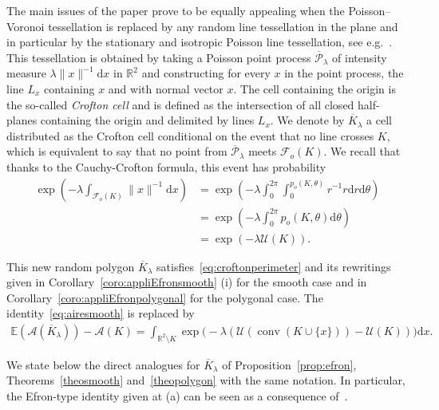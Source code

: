 \documentclass[AHL,Unicode,longabstracts,published]{cedram}
\DeclareMathOperator{\conv}{conv}
\newcommand{\cA}{\mathcal{A}}
\newcommand{\cF}{\mathcal{F}}
\newcommand{\cP}{\mathcal{P}}
\newcommand{\cU}{\mathcal{U}}
\newcommand{\dd}{\mathrm{d}}
\newcommand{\E}{\mathbb{E}}
\newcommand{\R}{\mathbb{R}}
\newcommand{\noi}{\noindent}
\newcommand{\R}{\mathbb{R}}
\begin{document}
The main issues of the paper prove to be equally appealing when the Poisson--Voronoi tessellation is replaced by any random line tessellation in the plane and in particular by the stationary and isotropic Poisson line tessellation, see e.g.~\cite[Section~10.3]{SW}. This tessellation is obtained by taking a Poisson point process $\overline{\cP}_\lambda$ of intensity measure $\lambda \|x\|^{-1}\dd x$ in $\R^2$ and constructing for every $x$ in the point process, the line $L_{x}$ containing $x$ and with normal vector $x$. The cell containing the origin is the so-called \emph{Crofton cell} and is defined as the intersection of all closed half-planes containing the origin and delimited by lines $L_{x}$. We denote by $\overline{K}_\lambda$ a cell distributed as the Crofton cell conditional on the event that no line crosses $K$, which is equivalent to say that no point from $\overline{\cP}_\lambda$ meets $\cF_o(K)$. We recall that thanks to the Cauchy-Crofton formula, this event has probability
\begin{align}
\exp\left(-\lambda\int_{\cF_o(K)}\|x\|^{-1}\dd x\right)&=\exp\left(-\lambda\int_{0}^{2\pi}\int_0^{p_o(K,\theta)}r^{-1}r\dd r \dd \theta\right)\nonumber\\
&=\exp\left(-\lambda\int_{0}^{2\pi}p_o(K,\theta)\dd \theta\right)\nonumber
\\
&=\exp(-\lambda\cU(K)).\label{eq:probavidecrofton}
\end{align}


This new random polygon $\overline{K}_{\lambda}$ satisfies~\eqref{eq:croftonperimeter} and its rewritings given in Corollary~\ref{coro:appliEfronsmooth} (i) for the smooth case and in Corollary~\ref{coro:appliEfronpolygonal} for the polygonal case. The identity~\eqref{eq:airesmooth} is replaced by
\begin{align}\label{eq:defectareacrofton}
\E(\cA(\overline{K}_\lambda))-\cA(K) =\int_{\R^2\setminus K} \exp\Big(-\lambda (\cU(\conv(K\cup\{x\}))-\cU(K))\Big)\dd x.
\end{align}

We state below the direct analogues for $\overline{K}_\lambda$ of Proposition~\ref{prop:efron}, Theorems~\ref{theosmooth} and~\ref{theopolygon} with the same notation. In particular, the Efron-type identity given at (a) can be seen as a consequence of~\cite[penultimate display on page 693]{Sch09}.
\end{document}
